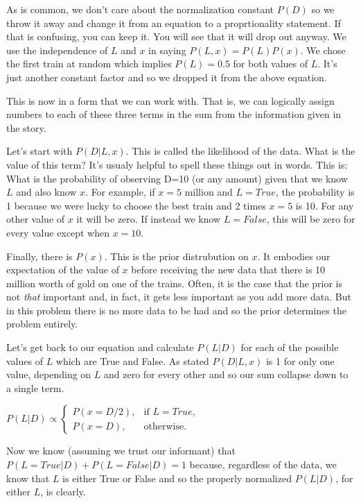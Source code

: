 \documentclass[12pt]{article}
\begin{document}
As is common, we don't care about the normalization constant $P(D)$ so we throw it away and change it from an equation to 
a proprtionality statement. If that is confusing, you can keep it. You will see that it will drop out anyway. 
We use the independence of $L$ and $x$ in saying $P(L,x) = P(L) P(x)$. We chose the first train at random which implies $P(L) =0.5$ for both values 
of $L$. It's just another constant factor and so we dropped it from the above equation. 

This is now in a form that we can work with. That is, we can logically assign numbers to each of these three terms 
in the sum from the information given in the story. 

Let's start with $P(D | L,x)$. This is called the likelihood of the data. What is the value of this term? It's usualy
helpful to spell these things out in words. This is: What is the probability of observing D=10 (or any amount) 
given that we know $L$ and also know $x$. For example, if $x=5$ million and $L=True$, the probability is 1 
because we were lucky to choose the best train and 2 times $x=5$ is 10. For any other value of $x$ it will be zero. 
If instead we know $L=False$, this will be zero for every value except when $x=10$. 

Finally, there is $P(x)$. This is the prior distrubution on $x$. It embodies our expectation of the value of $x$ before 
receiving the new data that there is 10 million worth of gold on one of the trains. Often, it is the case that the 
prior is not \emph{that} important and, in fact, it gets less important as you add more data. But in this problem there is 
no more data to be had and so the prior determines the problem entirely. 

Let's get back to our equation and calculate $P(L | D)$ for each of the possible values of $L$ which are True and False.
As stated $P(D| L,x)$ is 1 for only one value, depending on $L$ and zero for every other and so our sum collapse down 
to a single term. 

$P(L|D) \propto
\begin{cases}

  P(x=D/2), & \text{if } L = True, \\
  P(x=D), & \text{otherwise}.
\end{cases}$
 
Now we know (assuming we trust our informant) that $P(L= True | D) + P(L= False | D) =1$ because, 
regardless of the data, we know that $L$ is either True or False and so the properly normalized $P(L | D)$, 
for either $L$, is clearly. 
\end{document}
